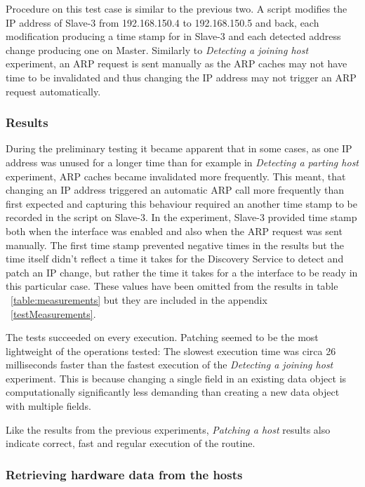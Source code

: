 Procedure on this test case is similar to the previous two. A script modifies the IP address of Slave-3 from 192.168.150.4 to 192.168.150.5 and back, each modification producing a time stamp for in Slave-3 and each detected address change producing one on Master. Similarly to \textit{Detecting a joining host} experiment, an ARP request is sent manually as the ARP caches may not have time to be invalidated and thus changing the IP address may not trigger an ARP request automatically.

\subsubsection*{Results}

During the preliminary testing it became apparent that in some cases, as one IP address was unused for a longer time than for example in \textit{Detecting a parting host} experiment, ARP caches became invalidated more frequently. This meant, that changing an IP address triggered an automatic ARP call more frequently than first expected and capturing this behaviour required an another time stamp to be recorded in the script on Slave-3. In the experiment, Slave-3 provided time stamp both when the interface was enabled and also when the ARP request was sent manually. The first time stamp prevented negative times in the results but the time itself didn't reflect a time it takes for the Discovery Service to detect and patch an IP change, but rather the time it takes for a the interface to be ready in this particular case. These values have been omitted from the results in table ~\ref{table:measurements} but they are included in the appendix ~\ref{testMeasurements}.

The tests succeeded on every execution. Patching seemed to be the most lightweight of the operations tested: The slowest execution time was circa 26 milliseconds faster than the fastest execution of the \textit{Detecting a joining host} experiment. This is because changing a single field in an existing data object is computationally significantly less demanding than creating a new data object with multiple fields.

Like the results from the previous experiments, \textit{Patching a host} results also indicate correct, fast and regular execution of the routine.

\subsubsection{Retrieving hardware data from the hosts}

